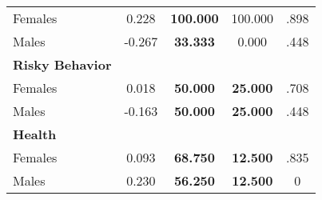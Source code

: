 \begin{tabular}{l c c c c}
\quad Females &      0.228 & \textbf{  100.000} &   100.000 & .898 \\
\quad Males &     -0.267 & \textbf{   33.333} &     0.000 & .448 \\
\midrule
\textbf{Risky Behavior} & & & & \\
\quad Females &      0.018 & \textbf{   50.000} & \textbf{   25.000} & .708 \\
\quad Males &     -0.163 & \textbf{   50.000} & \textbf{   25.000} & .448 \\
\midrule
\textbf{Health} & & & & \\
\quad Females &      0.093 & \textbf{   68.750} & \textbf{   12.500} & .835 \\
\quad Males &      0.230 & \textbf{   56.250} & \textbf{   12.500} & 0 \\
\midrule
\bottomrule
\end{tabular}
